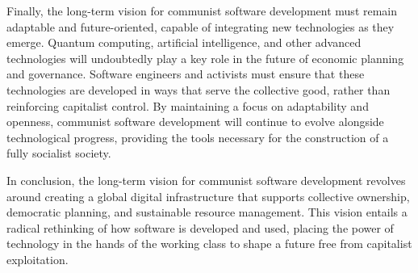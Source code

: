 \begin{refsection}
Finally, the long-term vision for communist software development must remain adaptable and future-oriented, capable of integrating new technologies as they emerge. Quantum computing, artificial intelligence, and other advanced technologies will undoubtedly play a key role in the future of economic planning and governance. Software engineers and activists must ensure that these technologies are developed in ways that serve the collective good, rather than reinforcing capitalist control. By maintaining a focus on adaptability and openness, communist software development will continue to evolve alongside technological progress, providing the tools necessary for the construction of a fully socialist society.

In conclusion, the long-term vision for communist software development revolves around creating a global digital infrastructure that supports collective ownership, democratic planning, and sustainable resource management. This vision entails a radical rethinking of how software is developed and used, placing the power of technology in the hands of the working class to shape a future free from capitalist exploitation.

\printbibliography[heading=subbibliography]
\end{refsection}
